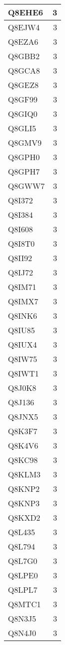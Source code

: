 \documentclass[
]{book}
\theoremstyle{definition}
\theoremstyle{definition}
\theoremstyle{definition}
\theoremstyle{definition}
\theoremstyle{remark}
\begin{document}
\begin{table}
\begin{tabular}{l|r}
\hline
Q8EHE6 & 3\\
\hline
Q8EJW4 & 3\\
\hline
Q8EZA6 & 3\\
\hline
Q8GBB2 & 3\\
\hline
Q8GCA8 & 3\\
\hline
Q8GEZ8 & 3\\
\hline
Q8GF99 & 3\\
\hline
Q8GIQ0 & 3\\
\hline
Q8GLI5 & 3\\
\hline
Q8GMV9 & 3\\
\hline
Q8GPH0 & 3\\
\hline
Q8GPH7 & 3\\
\hline
Q8GWW7 & 3\\
\hline
Q8I372 & 3\\
\hline
Q8I384 & 3\\
\hline
Q8I608 & 3\\
\hline
Q8I8T0 & 3\\
\hline
Q8II92 & 3\\
\hline
Q8IJ72 & 3\\
\hline
Q8IM71 & 3\\
\hline
Q8IMX7 & 3\\
\hline
Q8INK6 & 3\\
\hline
Q8IU85 & 3\\
\hline
Q8IUX4 & 3\\
\hline
Q8IW75 & 3\\
\hline
Q8IWT1 & 3\\
\hline
Q8J0K8 & 3\\
\hline
Q8J136 & 3\\
\hline
Q8JNX5 & 3\\
\hline
Q8K3F7 & 3\\
\hline
Q8K4V6 & 3\\
\hline
Q8KC98 & 3\\
\hline
Q8KLM3 & 3\\
\hline
Q8KNP2 & 3\\
\hline
Q8KNP3 & 3\\
\hline
Q8KXD2 & 3\\
\hline
Q8L435 & 3\\
\hline
Q8L794 & 3\\
\hline
Q8L7G0 & 3\\
\hline
Q8LPE0 & 3\\
\hline
Q8LPL7 & 3\\
\hline
Q8MTC1 & 3\\
\hline
Q8N3J5 & 3\\
\hline
Q8N4J0 & 3\\

\end{tabular}
\end{table}
\end{document}
